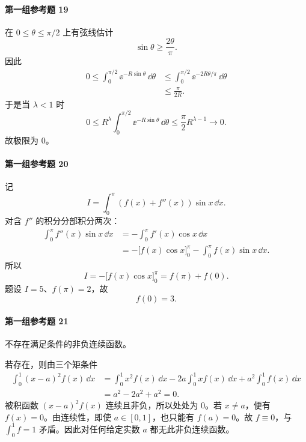 \paragraph{第一组参考题 19}
\begin{xsolution}
在 $0\leqslant\theta\leqslant\pi/2$ 上有弦线估计
\[
  \sin\theta\geqslant\frac{2\theta}{\pi}.
\]
因此
\begin{align*}
  0\leqslant
  \int_0^{\pi/2}\ee^{-R\sin\theta}\,\dd\theta
  &\leqslant\int_0^{\pi/2}\ee^{-2R\theta/\pi}\,\dd\theta\\
  &\leqslant\frac\pi{2R}.
\end{align*}
于是当 $\lambda<1$ 时
\[
  0\leqslant R^\lambda\int_0^{\pi/2}\ee^{-R\sin\theta}\,\dd\theta
  \leqslant\frac\pi2R^{\lambda-1}\to0.
\]
故极限为 $\boxed{0}$。
\end{xsolution}

\paragraph{第一组参考题 20}
\begin{xsolution}
记
\[
  I=\int_0^\pi(f(x)+f''(x))\sin x\,\dd x.
\]
对含 $f''$ 的积分分部积分两次：
\begin{align*}
  \int_0^\pi f''(x)\sin x\,\dd x
  &=-\int_0^\pi f'(x)\cos x\,\dd x\\
  &=-\bigl[f(x)\cos x\bigr]_0^\pi
  -\int_0^\pi f(x)\sin x\,\dd x.
\end{align*}
所以
\[
  I=-\bigl[f(x)\cos x\bigr]_0^\pi
  =f(\pi)+f(0).
\]
题设 $I=5$、$f(\pi)=2$，故
\[
  \boxed{f(0)=3}.
\]
\end{xsolution}

\paragraph{第一组参考题 21}
\begin{xsolution}
不存在满足条件的非负连续函数。

若存在，则由三个矩条件
\begin{align*}
  \int_0^1(x-a)^2f(x)\,\dd x
  &=\int_0^1x^2f(x)\,\dd x
  -2a\int_0^1xf(x)\,\dd x
  +a^2\int_0^1f(x)\,\dd x\\
  &=a^2-2a^2+a^2=0.
\end{align*}
被积函数 $(x-a)^2f(x)$ 连续且非负，所以处处为 $0$。若 $x\ne a$，便有 $f(x)=0$。由连续性，即使 $a\in[0,1]$，也只能有 $f(a)=0$。故 $f\equiv0$，与 $\int_0^1f=1$ 矛盾。因此对任何给定实数 $a$ 都无此非负连续函数。
\end{xsolution}

